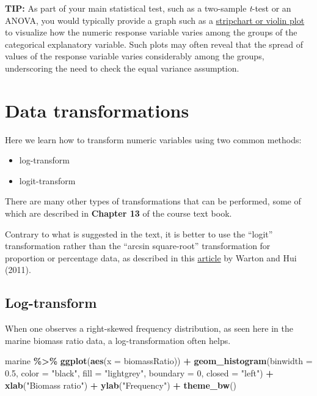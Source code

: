 \documentclass[
]{book}
\newenvironment{Shaded}{\begin{snugshade}}{\end{snugshade}}
\newcommand{\AttributeTok}[1]{\textcolor[rgb]{0.13,0.29,0.53}{#1}}
\newcommand{\DecValTok}[1]{\textcolor[rgb]{0.00,0.00,0.81}{#1}}
\newcommand{\FloatTok}[1]{\textcolor[rgb]{0.00,0.00,0.81}{#1}}
\newcommand{\FunctionTok}[1]{\textcolor[rgb]{0.13,0.29,0.53}{\textbf{#1}}}
\newcommand{\NormalTok}[1]{#1}
\newcommand{\SpecialCharTok}[1]{\textcolor[rgb]{0.81,0.36,0.00}{\textbf{#1}}}
\newcommand{\StringTok}[1]{\textcolor[rgb]{0.31,0.60,0.02}{#1}}
\providecommand{\tightlist}{%
  \setlength{\itemsep}{0pt}\setlength{\parskip}{0pt}}
\begin{document}
\textbf{TIP: }
As part of your main statistical test, such as a two-sample \emph{t}-test or an ANOVA, you would typically provide a graph such as a \hyperref[numeric_vs_cat]{stripchart or violin plot} to visualize how the numeric response variable varies among the groups of the categorical explanatory variable. Such plots may often reveal that the spread of values of the response variable varies considerably among the groups, underscoring the need to check the equal variance assumption.

\section{Data transformations}\label{transform}

Here we learn how to transform numeric variables using two common methods:

\begin{itemize}
\tightlist
\item
  log-transform
\item
  logit-transform
\end{itemize}

There are many other types of transformations that can be performed, some of which are described in \textbf{Chapter 13} of the course text book.

Contrary to what is suggested in the text, it is better to use the ``logit'' transformation rather than the ``arcsin square-root'' transformation for proportion or percentage data, as described in this \href{http://onlinelibrary.wiley.com/doi/10.1890/10-0340.1/abstract}{article} by Warton and Hui (2011).

\subsection{Log-transform}\label{log_transform}

When one observes a right-skewed frequency distribution, as seen here in the marine biomass ratio data, a log-transformation often helps.

\begin{Shaded}
\begin{Highlighting}[]
\NormalTok{marine }\SpecialCharTok{\%\textgreater{}\%}
  \FunctionTok{ggplot}\NormalTok{(}\FunctionTok{aes}\NormalTok{(}\AttributeTok{x =}\NormalTok{ biomassRatio)) }\SpecialCharTok{+}
  \FunctionTok{geom\_histogram}\NormalTok{(}\AttributeTok{binwidth =} \FloatTok{0.5}\NormalTok{, }\AttributeTok{color =} \StringTok{"black"}\NormalTok{, }\AttributeTok{fill =} \StringTok{"lightgrey"}\NormalTok{, }
                 \AttributeTok{boundary =} \DecValTok{0}\NormalTok{, }\AttributeTok{closed =} \StringTok{"left"}\NormalTok{) }\SpecialCharTok{+}
  \FunctionTok{xlab}\NormalTok{(}\StringTok{"Biomass ratio"}\NormalTok{) }\SpecialCharTok{+}
  \FunctionTok{ylab}\NormalTok{(}\StringTok{"Frequency"}\NormalTok{) }\SpecialCharTok{+}
  \FunctionTok{theme\_bw}\NormalTok{()}
\end{Highlighting}
\end{Shaded}
\end{document}
